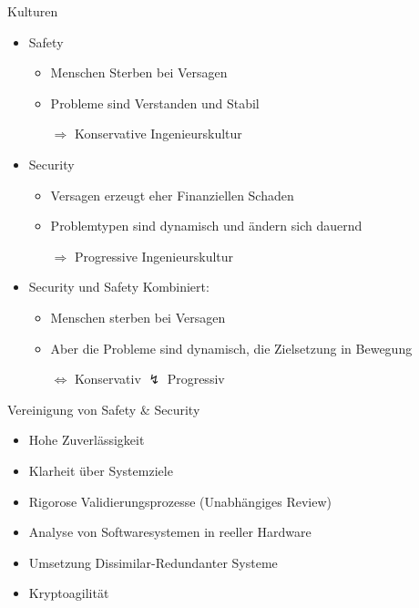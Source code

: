 \begin{frame}[T]{Kulturen}
  \begin{itemize}
    \item Safety
    \begin{itemize}
      \item Menschen Sterben bei Versagen
      \item Probleme sind Verstanden und Stabil
      \item[$\Rightarrow$] Konservative Ingenieurskultur
    \end{itemize}

    \item Security
    \begin{itemize}
      \item Versagen erzeugt eher Finanziellen Schaden
      \item Problemtypen sind dynamisch und ändern sich dauernd
      \item[$\Rightarrow$] Progressive Ingenieurskultur
    \end{itemize}

    \item Security und Safety Kombiniert:
    \begin{itemize}
      \item Menschen sterben bei Versagen
      \item Aber die Probleme sind dynamisch, die Zielsetzung in Bewegung
      \item[$\Leftrightarrow$] Konservativ $\lightning$ Progressiv
    \end{itemize}
  \end{itemize}
\end{frame}

\begin{frame}[T]{Vereinigung von Safety \& Security}
  \begin{itemize}
    \item Hohe Zuverlässigkeit
    \item Klarheit über Systemziele
    \item Rigorose Validierungsprozesse (Unabhängiges Review)
    \item Analyse von Softwaresystemen in reeller Hardware
    \item Umsetzung Dissimilar-Redundanter Systeme
    \item Kryptoagilität
  \end{itemize}
\end{frame}

